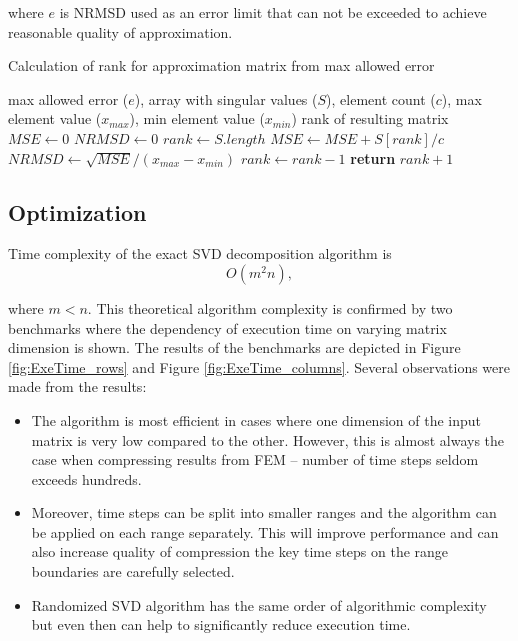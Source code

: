 where $e$ is NRMSD used as an error limit that can not be exceeded to achieve reasonable quality of approximation.

\begin{algorithm}
  \caption{Calculation of rank for approximation matrix from max allowed error}\label{rankAlgorithm}
  \label{alg:rank-calculation}
  \begin{algorithmic}[1]
  	\INPUT max allowed error ($e$), array with singular values ($S$), element count ($c$), max element value ($x_{max}$), min element value ($x_{min}$)
    \OUTPUT rank of resulting matrix
      \State $MSE \gets 0$
      \State $NRMSD \gets 0$
      \State $rank \gets S.length$
        \State $MSE \gets MSE + S[rank]/c$ 
        \State $NRMSD \gets \sqrt{MSE} / (x_{max} - x_{min})$ 
        \State $rank \gets rank - 1$ 
      \EndWhile
      \State \textbf{return} $rank + 1$ 
    \EndProcedure
  \end{algorithmic}
\end{algorithm}

\subsection{Optimization}

Time complexity of the exact SVD decomposition algorithm is $$O(m^2n),$$

where $m<n$. This theoretical algorithm complexity is confirmed by two benchmarks where the dependency of execution time on varying matrix dimension is shown. The results of the benchmarks are depicted in Figure \ref{fig:ExeTime_rows} and Figure \ref{fig:ExeTime_columns}. Several observations were made from the results:

\begin{itemize}
\item The algorithm is most efficient in cases where one dimension of the input matrix is very low compared to the other. However, this is almost always the case when compressing results from FEM -- number of time steps seldom exceeds hundreds.
\item Moreover, time steps can be split into smaller ranges and the algorithm can be applied on each range separately. This will improve performance and can also increase quality of compression the key time steps on the range boundaries are carefully selected.
\item Randomized SVD algorithm has the same order of algorithmic complexity but even then can help to significantly reduce execution time.
\end{itemize}

